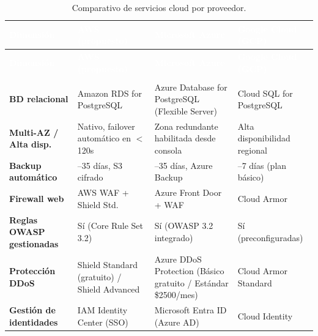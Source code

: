 \documentclass[12pt, a4paper]{article}
\begin{document}
\begin{longtable}{>{\raggedright\arraybackslash}p{3.2cm}
                  >{\raggedright\arraybackslash}p{3.5cm}
                  >{\raggedright\arraybackslash}p{3.5cm}
                  >{\raggedright\arraybackslash}p{3.5cm}}

\rowcolor{headerblue}
\textcolor{white}{\textbf{Dimensión}} &
\textcolor{white}{\textbf{AWS (propuesto)}} &
\textcolor{white}{\textbf{Microsoft Azure}} &
\textcolor{white}{\textbf{Google Cloud (GCP)}} \\
\endfirsthead

\rowcolor{headerblue}
\textcolor{white}{\textbf{Dimensión}} &
\textcolor{white}{\textbf{AWS (propuesto)}} &
\textcolor{white}{\textbf{Microsoft Azure}} &
\textcolor{white}{\textbf{Google Cloud (GCP)}} \\
\endhead

\caption{Comparativo de servicios cloud por proveedor.}
\label{tab:comparativo}\\

\rowcolor{rowlight}
\textbf{BD relacional} & Amazon RDS for PostgreSQL & Azure Database for PostgreSQL (Flexible Server) & Cloud SQL for PostgreSQL \\

\rowcolor{rowwhite}
\textbf{Multi-AZ / Alta disp.} & Nativo, failover automático en $<$120s & Zona redundante habilitada desde consola & Alta disponibilidad regional \\

\rowcolor{rowlight}
\textbf{Backup automático} & 1–35 días, S3 cifrado & 1–35 días, Azure Backup & 1–7 días (plan básico) \\

\rowcolor{rowwhite}
\textbf{Firewall web} & AWS WAF + Shield Std. & Azure Front Door + WAF & Cloud Armor \\

\rowcolor{rowlight}
\textbf{Reglas OWASP gestionadas} & Sí (Core Rule Set 3.2) & Sí (OWASP 3.2 integrado) & Sí (preconfiguradas) \\

\rowcolor{rowwhite}
\textbf{Protección DDoS} & Shield Standard (gratuito) / Shield Advanced & Azure DDoS Protection (Básico gratuito / Estándar \$2500/mes) & Cloud Armor Standard \\

\rowcolor{rowlight}
\textbf{Gestión de identidades} & IAM Identity Center (SSO) & Microsoft Entra ID (Azure AD) & Cloud Identity \\


\end{longtable}
\end{document}
